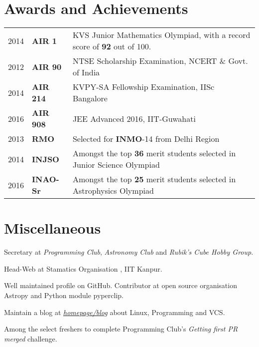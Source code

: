 \documentclass[]{deedy-resume-openfont}
\begin{document}
\begin{minipage}[t]{0.66\textwidth}
\section{Awards and Achievements} 
\begin{tabular}{rll}
  2014	   & \textbf{AIR 1}  & KVS Junior Mathematics Olympiad, with a record score of \textbf{92} out of 100. \\
  2012	   & \textbf{AIR 90} & NTSE Scholarship Examination, NCERT \& Govt. of India \\
  2014	   & \textbf{AIR 214}& KVPY-SA Fellowship Examination, IISc Bangalore \\
  2016     & \textbf{AIR 908}& JEE Advanced 2016, IIT-Guwahati \\
  2013	    & \textbf{RMO}     & Selected for \textbf{INMO}-14 from Delhi Region \\
  2014	    & \textbf{INJSO}   & Amongst the top \textbf{36} merit students selected in Junior Science Olympiad   \\
  2016      & \textbf{INAO-Sr} & Amongst the top \textbf{25} merit students selected in Astrophysics Olympiad  \\
\end{tabular}

\vspace{1 cm}

\section{Miscellaneous}
\vspace{\topsep}
\begin{tightemize}
\item Secretary at \emph{Programming Club}, \emph{Astronomy Club} and \emph{Rubik's Cube Hobby Group}.
\item Head-Web at Stamatics Organisation , IIT Kanpur.
\item Well maintained profile on GitHub. Contributor at open source organisation Astropy and Python module pyperclip.
\item Maintain a blog at \textit{\href{http://aniketpandey.com/blog}{homepage/blog}} about Linux, Programming and VCS.
\item Among the select freshers to complete Programming Club's \textit{Getting first PR merged} challenge. 
\end{tightemize}
\end{minipage} 
\end{document}
